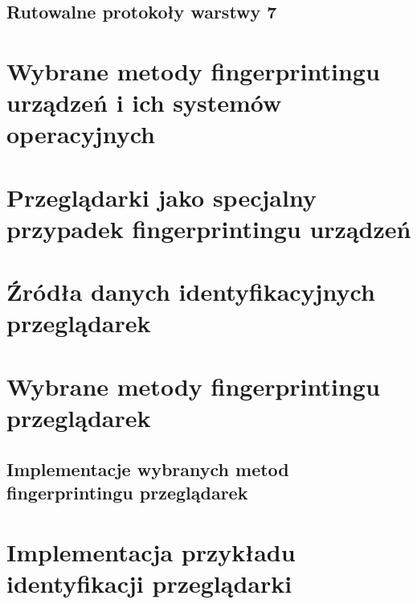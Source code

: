 \subsection{Rutowalne protokoły warstwy 7}

\section{Wybrane metody fingerprintingu urządzeń i ich systemów operacyjnych}

\section{Przeglądarki jako specjalny przypadek fingerprintingu urządzeń}

\section{Źródła danych identyfikacyjnych przeglądarek}

\section{Wybrane metody fingerprintingu przeglądarek}

\subsection{Implementacje wybranych metod fingerprintingu przeglądarek}

\section{Implementacja przykładu identyfikacji przeglądarki}
